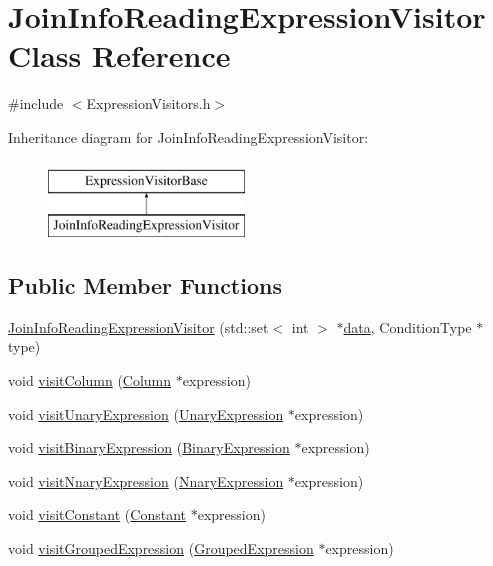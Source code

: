 \hypertarget{class_join_info_reading_expression_visitor}{\section{Join\+Info\+Reading\+Expression\+Visitor Class Reference}
\label{class_join_info_reading_expression_visitor}
}


{\ttfamily \#include $<$Expression\+Visitors.\+h$>$}

Inheritance diagram for Join\+Info\+Reading\+Expression\+Visitor\+:\begin{figure}[H]
\begin{center}
\leavevmode
\includegraphics[height=2.000000cm]{class_join_info_reading_expression_visitor}
\end{center}
\end{figure}
\subsection*{Public Member Functions}
\begin{DoxyCompactItemize}
\item 
\hyperlink{class_join_info_reading_expression_visitor_ab9cdf35ad447efd3cfba98440d3e135a}{Join\+Info\+Reading\+Expression\+Visitor} (std\+::set$<$ int $>$ $\ast$\hyperlink{class_join_info_reading_expression_visitor_aa7bdb75b8bb8ddbbb551c26f798503ca}{data}, Condition\+Type $\ast$type)
\item 
void \hyperlink{class_join_info_reading_expression_visitor_a03c3ec1bc690b6d9dc66a97efa75f2be}{visit\+Column} (\hyperlink{class_column}{Column} $\ast$expression)
\item 
void \hyperlink{class_join_info_reading_expression_visitor_a2254ead29d9226c771b530f43b677bd0}{visit\+Unary\+Expression} (\hyperlink{class_unary_expression}{Unary\+Expression} $\ast$expression)
\item 
void \hyperlink{class_join_info_reading_expression_visitor_a6c6326b1ca8218ed35ac86ab7d487a0e}{visit\+Binary\+Expression} (\hyperlink{class_binary_expression}{Binary\+Expression} $\ast$expression)
\item 
void \hyperlink{class_join_info_reading_expression_visitor_a81cdbded017bc5e294b014122b94391c}{visit\+Nnary\+Expression} (\hyperlink{class_nnary_expression}{Nnary\+Expression} $\ast$expression)
\item 
void \hyperlink{class_join_info_reading_expression_visitor_a5d94ca3c0172aeaf3436fd15f3d9ba35}{visit\+Constant} (\hyperlink{class_constant}{Constant} $\ast$expression)
\item 
void \hyperlink{class_join_info_reading_expression_visitor_af727a4e4a952f05080c8659ce0cff208}{visit\+Grouped\+Expression} (\hyperlink{class_grouped_expression}{Grouped\+Expression} $\ast$expression)
\end{DoxyCompactItemize}
